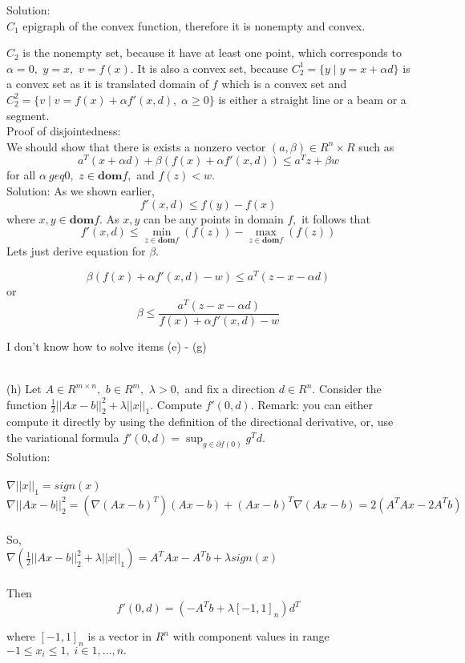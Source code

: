 \documentclass{article}
\begin{document}
Solution: \\

$C_1$ epigraph of the convex function, therefore 
it is nonempty and convex.

$C_2$ is the nonempty set, because it have at least one point, which corresponds to $\alpha = 0,$ $y = x,$ $v = f(x).$ It is also a convex set, because 
$C^1_2 = \{y\;| \;y = x + \alpha d\}$ is a convex set as it is translated domain of $f$ which is a convex set
and $C^2_2 = \{v\;| \; 
v = f(x) + \alpha f'(x, d), \; \alpha \geq 0 \}$ is either 
a straight line or a beam or a segment. \\

Proof of disjointedness: \\
We should show that there is exists a nonzero vector 
$(a, \beta) \in R^n \times R$ such as
$$
a^T(x + \alpha d) + \beta (f(x) + \alpha f'(x, d)) \leq
a^T z + \beta w
$$
for all $\alpha \ geq 0, $ $z \in \mathbf{dom} f,$ 
and $f(z) < w.$
\\
Solution:
As we shown earlier, 
$$
f'(x, d) \leq f(y) - f(x)
$$
where $x, y \in \mathbf{dom} f.$ As $x, y$ can be any points in domain $f,$ it follows that\\
$$
f'(x, d) \leq \min_{z \in \mathbf{dom} f }(f(z)) - 
\max_{z \in \mathbf{dom} f}(f(z))
$$
Lets just derive equation for $\beta.$

$$
\beta (f(x) + \alpha f'(x, d) - w) \leq 
a^T(z - x - \alpha d)
$$
or
$$
\beta \leq \frac{a^T (z - x - \alpha d)}
{f(x) + \alpha f'(x, d) - w}
$$

I don't know how to solve items (e) - (g) \\\

(h) Let $A \in R^{m\times n},$ $b \in R^m,$ $\lambda > 0,$ 
and fix a direction $d \in R^n.$ Consider the function 
$\frac{1}{2} ||Ax - b||^2_2 + \lambda ||x||_1.$ Compute 
$f'(0, d).$ Remark: you can either compute it
directly by using the definition of the directional derivative, or, use the variational
formula $f'(0, d) = \sup_{g \in \partial f(0)} g^T d.$
\\

Solution: \\ \\
$
\nabla ||x||_1 = sign(x)
$\\
$\nabla ||Ax - b||^2_2 = (\nabla (Ax - b)^T) (Ax - b) + 
(Ax - b)^T \nabla (Ax - b) = 2(A^TAx - 2 A^T b)
$\\ \\
So, \\
$
\nabla (\frac{1}{2} ||Ax - b||^2_2 + \lambda ||x||_1) = 
A^TAx - A^T b + \lambda sign(x)
$
\\ \\
Then \\
$$
f'(0, d) = (- A^T b + \lambda [-1, 1]_n) d^T
$$

where $ [-1, 1]_n$ is a vector in $R^n$ with component values in range \\
$-1 \leq x_i \leq 1, \; i \in {1, \dots , n}.$
\end{document}
